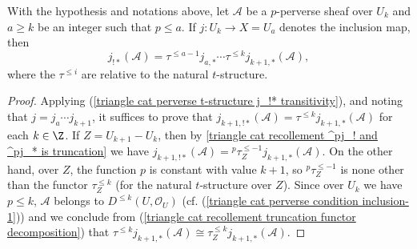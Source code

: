 \begin{proposition}\label{triangle cat perverse t-structure j_!* for open union char}
With the hypothesis and notations above, let $\mathscr{A}$ be a $p$-perverse sheaf over $U_k$ and $a\geq k$ be an integer such that $p\leq a$. If $j:U_k\to X=U_a$ denotes the inclusion map, then
\[j_{!*}(\mathscr{A})=\tau^{\leq a-1}j_{a,*}\cdots\tau^{\leq k}j_{k+1,*}(\mathscr{A}),\]
where the $\tau^{\leq i}$ are relative to the natural $t$-structure.
\end{proposition}
\begin{proof}
Applying (\ref{triangle cat perverse t-structure j_!* transitivity}), and noting that $j=j_a\cdots j_{k+1}$, it suffices to prove that $j_{k+1,!*}(\mathscr{A})=\tau^{\leq k}j_{k+1,*}(\mathscr{A})$ for each $k\in\Z$. If $Z=U_{k+1}-U_k$, then by \cref{triangle cat recollement ^pj_! and ^pj_* is truncation} we have $j_{k+1,!*}(\mathscr{A})={^p\tau^{\leq -1}_Z}j_{k+1,*}(\mathscr{A})$. On the other hand, over $Z$, the function $p$ is constant with value $k+1$, so ${^p\tau^{\leq-1}_Z}$ is none other than the functor $\tau^{\leq k}_Z$ (for the natural $t$-structure over $Z$). Since over $U_k$ we have $p\leq k$, $\mathscr{A}$ belongs to $D^{\leq k}(U,\mathscr{O}_U)$ (cf. (\ref{triangle cat perverse condition inclusion-1})) and we conclude from (\ref{triangle cat recollement truncation functor decomposition}) that $\tau^{\leq k}j_{k+1,*}(\mathscr{A})\cong\tau^{\leq k}_Zj_{k+1,*}(\mathscr{A})$.
\end{proof}

